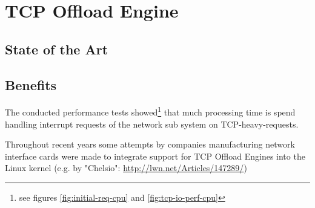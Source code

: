 \chapter{TCP Offload Engine}

\section{State of the Art}

\section{Benefits}

The conducted performance tests showed\footnote{see figures \ref{fig:initial-req-cpu} and \ref{fig:tcp-io-perf-cpu}} that much processing time is spend handling interrupt requests of the network sub system on TCP-heavy-requests.

Throughout recent years some attempts by companies manufacturing network interface cards were made to integrate support for TCP Offload Engines into the Linux kernel (e.g. by "Chelsio": \url{http://lwn.net/Articles/147289/})